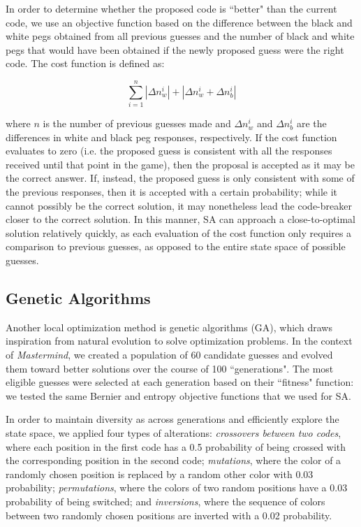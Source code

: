 \documentclass[11pt]{article}
\begin{document}
In order to determine whether the proposed code is ``better" than the current code, we use an objective function based on the difference between the black and white pegs obtained from all previous guesses and the number of black and white pegs that would have been obtained if the newly proposed guess were the right code. The cost function is defined as:

\[
\sum_{i=1}^n | \Delta n_w^i | + | \Delta n_w^i + \Delta n_b^i |
\]

\noindent where $n$ is the number of previous guesses made and $\Delta n_w^i $ and $\Delta n_b^i$ are the differences in white and black peg responses, respectively. If the cost function evaluates to zero (i.e. the proposed guess is consistent with all the responses received until that point in the game), then the proposal is accepted as it may be the correct answer. If, instead, the proposed guess is only consistent with some of the previous responses, then it is accepted with a certain probability; while it cannot possibly be the correct solution, it may nonetheless lead the code-breaker closer to the correct solution. In this manner, SA can approach a close-to-optimal solution relatively quickly, as each evaluation of the cost function only requires a comparison to previous guesses, as opposed to the entire state space of possible guesses.

\subsection{Genetic Algorithms}

Another local optimization method is genetic algorithms (GA), which draws inspiration from natural evolution to solve optimization problems. In the context of \textit{Mastermind}, we created a population of 60 candidate guesses and evolved them toward better solutions over the course of 100 ``generations". The most eligible guesses were selected at each generation based on their ``fitness" function: we tested the same Bernier and entropy objective functions that we used for SA.

\newpage

In order to maintain diversity as across generations and efficiently explore the state space, we applied four types of alterations: \textit{crossovers between two codes}, where each position in the first code has a 0.5 probability of being crossed with the corresponding position in the second code; \textit{mutations}, where the color of a randomly chosen position is replaced by a random other color with 0.03 probability; \textit{permutations}, where the colors of two random positions have a 0.03 probability of being switched; and \textit{inversions}, where the sequence of colors between two randomly chosen positions are inverted with a 0.02 probability.
\end{document}

